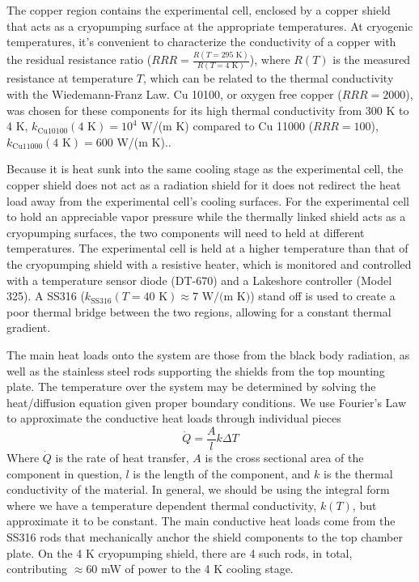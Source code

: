 The copper region contains the experimental cell, enclosed by a copper shield that acts as a cryopumping surface at the appropriate temperatures. At cryogenic temperatures, it's convenient to characterize the conductivity of a copper with the residual resistance ratio ($RRR=\frac{R(T=295\text{ K})}{R(T=4\text{ K})}$), where $R(T)$ is the measured resistance at temperature $T$, which can be related to the thermal conductivity with the Wiedemann-Franz Law.\cite{White2009} Cu 10100, or oxygen free copper ($RRR=2000$), was chosen for these components for its high thermal conductivity from 300 K to 4 K, $k_{\mathrm{Cu 10100}}(4\text{ K}) = 10^4$ W/(m K) compared to Cu 11000 ($RRR=100$), $k_{\mathrm{Cu 11000}}(4\text{ K}) = 600$ W/(m K).\cite{Simon1992}.

Because it is heat sunk into the same cooling stage as the experimental cell, the copper shield does not act as a radiation shield for it does not redirect the heat load away from the experimental cell's cooling surfaces. For the experimental cell to hold an appreciable vapor pressure while the thermally linked shield acts as a cryopumping surfaces, the two components will need to held at different temperatures. The experimental cell is held at a higher temperature than that of the cryopumping shield with a resistive heater, which is monitored and controlled with a temperature sensor diode (DT-670) and a Lakeshore controller (Model 325). A SS316 ($k_{\mathrm{SS 316}}(T=40\text{ K}) \approx 7\text{ W/(m K)}$) stand off is used to create a poor thermal bridge between the two regions, allowing for a constant thermal gradient.

The main heat loads onto the system are those from the black body radiation, as well as the stainless steel rods supporting the shields from the top mounting plate. The temperature over the system may be determined by solving the heat/diffusion equation given proper boundary conditions. We use Fourier's Law to approximate the conductive heat loads through individual pieces
\begin{equation}
	\dot{Q} = \frac{A}{l}k\Delta T
	\label{eq: fourier law}
\end{equation}
Where $\dot{Q}$ is the rate of heat transfer, $A$ is the cross sectional area of the component in question, $l$ is the length of the component, and $k$ is the thermal conductivity of the material. In general, we should be using the integral form where we have a temperature dependent thermal conductivity, $k(T)$, but approximate it to be constant. The main conductive heat loads come from the SS316 rods that mechanically anchor the shield components to the top chamber plate. On the 4 K cryopumping shield, there are 4 such rods, in total, contributing $\approx 60$ mW of power to the 4 K cooling stage.

